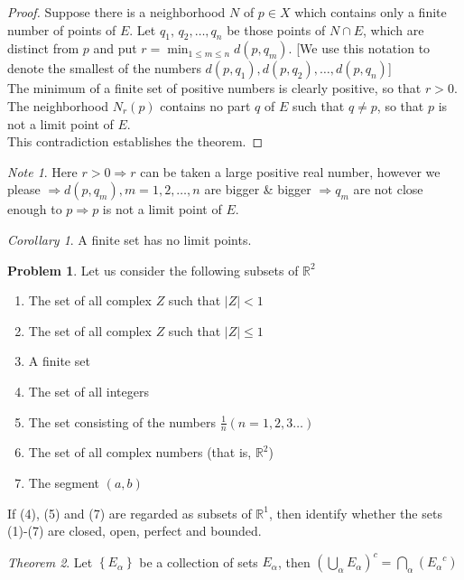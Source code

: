 \documentclass[12pt,oneside,a4paper]{book}
\newcommand{\R}{\mathds{R}}
\newcommand{\xn}[2]{{#1}_1{#2}\,{#1}_2{#2}\dots{#2}{#1}_n}
\newcommand{\abs}[1]{\left\vert#1\right\vert}
\newcommand{\set}[1]{\left\{#1\right\}}
\theoremstyle{remark}
\newtheorem* {note}{Note}
\newtheorem{thm}{Theorem}[section]
\newtheorem{cor}[thm]{Corollary}
\theoremstyle{definition}
\newtheorem{prob}{Problem}[section]
\begin{document}
\begin{proof}
    Suppose there is a neighborhood $ N $ of $ p \in X $ which contains only a finite number of points of $ E $. Let  $\xn{q}{,} $ be those points of $ N\cap E $, which are distinct from $ p $ and put $ r=
   \operatorname*{min}_{1\leq m\leq n} d(p,q_m) $. [We use this notation to denote the smallest of the numbers $ d(p,q_1),d(p,q_2),\dots,d(p,q_n) $]\\
   The minimum of a finite set of positive numbers is clearly positive, so that $ r>0 $.\\

   The neighborhood $ N_r(p) $ contains no part $ q $ of $ E $ such that $ q\neq p $, so that $ p $ is not a limit point of $ E $.\\
   This contradiction establishes the theorem.
\end{proof}
\begin{note}
    Here $ r>0\Rightarrow r $ can be taken a large positive real number, however we please $ \Rightarrow d(p,q_m), m=1,2,\dots,n $ are bigger \& bigger $ \Rightarrow q_m $ are not close enough to $ p \Rightarrow p $ is not a limit point of $ E $. 
\end{note}
\begin{cor}
    A finite set has no limit points.
\end{cor}
\begin{prob}
    Let us consider the following subsets of $ \R^2 $
    \begin{enumerate}
        \item The set of all complex $ Z $ such that $ \abs{Z}<1 $
        \item The set of all complex $ Z $ such that $ \abs{Z}\leq1 $
        \item A finite set
        \item The set of all integers
        \item The set consisting of the numbers $ \frac{1}{n}(n=1,2,3\dots) $
        \item The set of all complex numbers (that is, $ \R^2 $)
        \item The segment $ (a,b) $
    \end{enumerate}
    If (4), (5) and (7) are regarded as subsets of $ \R^1 $, then identify whether the sets (1)-(7) are closed, open, perfect and bounded.
\end{prob}
\begin{thm}
    Let $ \set{E_\alpha} $ be a collection of sets $ E_\alpha $, then $ (\bigcup_\alpha E_\alpha)^c  = \bigcap_\alpha ({E_\alpha}^c)$
\end{thm}
\end{document}
